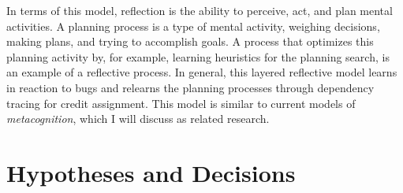 In terms of this model, reflection is the ability to perceive, act,
and plan mental activities.  A planning process is a type of mental
activity, weighing decisions, making plans, and trying to accomplish
goals.  A process that optimizes this planning activity by, for
example, learning heuristics for the planning search, is an example of
a reflective process.  In general, this layered reflective model
learns in reaction to bugs and relearns the planning processes through
dependency tracing for credit assignment.  This model is similar to
current models of \emph{metacognition}, which I will discuss as
related research.

\section{Hypotheses and Decisions}

